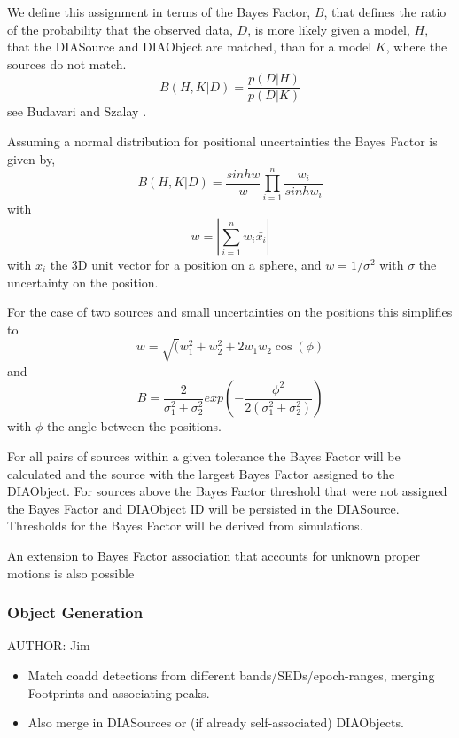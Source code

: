 We define this assignment in terms of the Bayes Factor, $B$, that defines
the ratio of the probability that the observed data, $D$, is more
likely given a model, $H$, that the DIASource and DIAObject are
matched, than for a model $K$, where the sources do not match. 
\begin{equation}
B(H,K|D) = \frac{p(D|H)}{p(D|K)}
\end{equation}
see Budavari and Szalay \cite{budavariSzalay2009}.

Assuming a normal distribution for positional uncertainties the Bayes
Factor is given by, 
\begin{equation} 
B(H,K|D) = \frac{sinh w}{w} \prod_{i=1}^n \frac{w_i}{sinh w_i}
\end{equation} 
with 
\begin{equation}
w = |\sum_{i=1}^n w_i \bar{x_i} |
\end{equation}
with $x_i$ the 3D unit vector for a position on a sphere, and
$w=1/\sigma^2$ with $\sigma$ the uncertainty on the position.

For the case of two sources and small uncertainties on the positions this simplifies to 
\begin{equation}
w = \sqrt(w_1^2 + w_2^2 +2 w_1 w_2 \cos(\phi)
\end{equation}
and
\begin{equation}
B=\frac{2}{\sigma_1^2 + \sigma_2^2} exp(-\frac{\phi^2}{2(\sigma_1^2 + \sigma_2^2)})
\end{equation}
with $\phi$ the angle between the positions.

For all pairs of sources within a given tolerance the Bayes Factor
will be calculated and the source with the largest Bayes Factor
assigned to the DIAObject. For sources above the Bayes Factor
threshold that were not assigned the Bayes Factor and DIAObject ID
will be persisted in the DIASource. Thresholds for the Bayes Factor
will be derived from simulations.

An extension to Bayes Factor association that accounts for unknown
proper motions is also possible \citep{???}

\subsubsection{Object Generation}
\label{sec:acObjectGeneration}
AUTHOR: Jim
\begin{itemize}
\item Match coadd detections from different bands/SEDs/epoch-ranges, merging Footprints and associating peaks.
\item Also merge in DIASources or (if already self-associated) DIAObjects.
\end{itemize}

